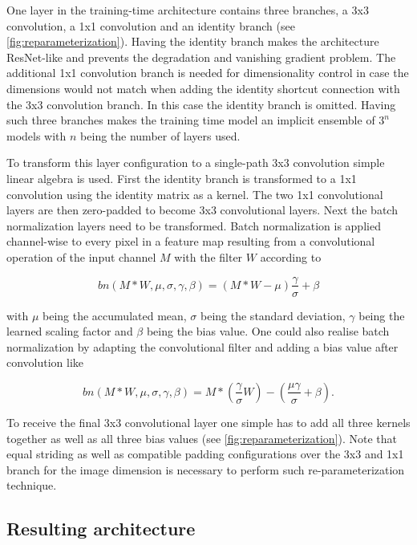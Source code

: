 One layer in the training-time architecture contains three branches, a 3x3 convolution, a 1x1 convolution and an identity branch (see \autoref{fig:reparameterization}). Having the identity branch makes the architecture ResNet-like and prevents the degradation and vanishing gradient problem. The additional 1x1 convolution branch is needed for dimensionality control in case the dimensions would not match when adding the identity shortcut connection with the 3x3 convolution branch. In this case the identity branch is omitted. Having such three branches makes the training time model an implicit ensemble of $3^n$ models with $n$ being the number of layers used. 

To transform this layer configuration to a single-path 3x3 convolution simple linear algebra is used. First the identity branch is transformed to a 1x1 convolution using the identity matrix as a kernel. The two 1x1 convolutional layers are then zero-padded to become 3x3 convolutional layers. Next the batch normalization layers need to be transformed. Batch normalization is applied channel-wise to every pixel in a feature map resulting from a convolutional operation of the input channel $M$ with the filter $W$ according to 

\begin{equation} \label{eq:batchnormalization}
	bn(M*W, \mu, \sigma, \gamma, \beta) = (M*W - \mu)\frac{\gamma}{\sigma} + \beta
\end{equation}

with $\mu$ being the accumulated mean, $\sigma$ being the standard deviation, $\gamma$ being the learned scaling factor and $\beta$ being the bias value. One could also realise batch normalization by adapting the convolutional filter and adding a bias value after convolution like 

\begin{equation} \label{eq:batchnormalizationtransformed}
	bn(M*W, \mu, \sigma, \gamma, \beta) = M*(\frac{\gamma}{\sigma}W) - (\frac{\mu\gamma}{\sigma} + \beta).
\end{equation}

To receive the final 3x3 convolutional layer one simple has to add all three kernels together as well as all three bias values (see \autoref{fig:reparameterization}). Note that equal striding as well as compatible padding configurations over the 3x3 and 1x1 branch for the image dimension is necessary to perform such re-parameterization technique. 

\subsection{Resulting architecture}

